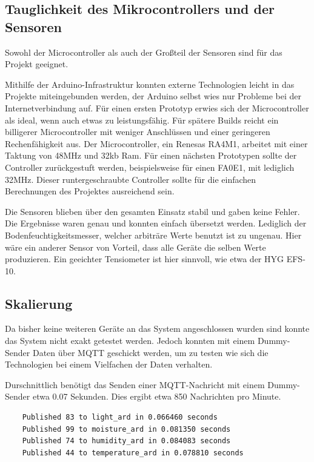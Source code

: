 \subsection{Tauglichkeit des Mikrocontrollers und der Sensoren}
Sowohl der Microcontroller als auch der Großteil der Sensoren sind für das Projekt geeignet.

Mithilfe der Arduino-Infrastruktur konnten externe Technologien leicht in das Projekte miteingebunden werden, der Arduino selbst wies nur Probleme bei der Internetverbindung auf. Für einen ersten Prototyp erwies sich der Microcontroller als ideal, wenn auch etwas zu leistungsfähig. Für spätere Builds reicht ein billigerer Microcontroller mit weniger Anschlüssen und einer geringeren Rechenfähigkeit aus. Der Microcontroller, ein Renesas RA4M1, arbeitet mit einer Taktung von 48MHz und 32kb Ram. Für einen nächsten Prototypen sollte der Controller zurückgestuft werden, beispielsweise für einen FA0E1, mit lediglich 32MHz. Dieser runtergeschraubte Controller sollte für die einfachen Berechnungen des Projektes ausreichend sein.

Die Sensoren blieben über den gesamten Einsatz stabil und gaben keine Fehler. Die Ergebnisse waren genau und konnten einfach übersetzt werden. Lediglich der Bodenfeuchtigkeitsmesser, welcher arbiträre Werte benutzt ist zu ungenau. Hier wäre ein anderer Sensor von Vorteil, dass alle Geräte die selben Werte produzieren. Ein geeichter Tensiometer ist hier sinnvoll, wie etwa der HYG EFS-10.\cite{reichelt2024hygefs10}

\subsection{Skalierung}
Da bisher keine weiteren Geräte an das System angeschlossen wurden sind konnte das System nicht exakt getestet werden. Jedoch konnten mit einem Dummy-Sender Daten über MQTT geschickt werden, um zu testen wie sich die Technologien bei einem Vielfachen der Daten verhalten.

Durschnittlich benötigt das Senden einer MQTT-Nachricht mit einem Dummy-Sender etwa 0.07 Sekunden. Dies ergibt etwa 850 Nachrichten pro Minute.

\begin{verbatim}
    Published 83 to light_ard in 0.066460 seconds
    Published 99 to moisture_ard in 0.081350 seconds
    Published 74 to humidity_ard in 0.084083 seconds
    Published 44 to temperature_ard in 0.078810 seconds
\end{verbatim}


